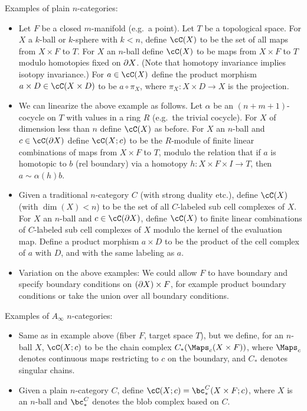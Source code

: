 Examples of plain $n$-categories:
\begin{itemize}

\item Let $F$ be a closed $m$-manifold (e.g.\ a point).
Let $T$ be a topological space.
For $X$ a $k$-ball or $k$-sphere with $k < n$, define $\cC(X)$ to be the set of 
all maps from $X\times F$ to $T$.
For $X$ an $n$-ball define $\cC(X)$ to be maps from $X\times F$ to $T$ modulo
homotopies fixed on $\partial X$.
(Note that homotopy invariance implies isotopy invariance.)
For $a\in \cC(X)$ define the product morphism $a\times D \in \cC(X\times D)$ to
be $a\circ\pi_X$, where $\pi_X : X\times D \to X$ is the projection.

\item We can linearize the above example as follows.
Let $\alpha$ be an $(n{+}m{+}1)$-cocycle on $T$ with values in a ring $R$
(e.g.\ the trivial cocycle).
For $X$ of dimension less than $n$ define $\cC(X)$ as before.
For $X$ an $n$-ball and $c\in \cC(\bd X)$ define $\cC(X; c)$ to be
the $R$-module of finite linear combinations of maps from $X\times F$ to $T$,
modulo the relation that if $a$ is homotopic to $b$ (rel boundary) via a homotopy
$h: X\times F\times I \to T$, then $a \sim \alpha(h)b$.

\item Given a traditional $n$-category $C$ (with strong duality etc.),
define $\cC(X)$ (with $\dim(X) < n$) 
to be the set of all $C$-labeled sub cell complexes of $X$.
For $X$ an $n$-ball and $c\in \cC(\bd X)$, define $\cC(X)$ to finite linear
combinations of $C$-labeled sub cell complexes of $X$
modulo the kernel of the evaluation map.
Define a product morphism $a\times D$ to be the product of the cell complex of $a$ with $D$,
and with the same labeling as $a$.

\item Variation on the above examples:
We could allow $F$ to have boundary and specify boundary conditions on $(\partial X)\times F$,
for example product boundary conditions or take the union over all boundary conditions.

\end{itemize}


Examples of $A_\infty$ $n$-categories:
\begin{itemize}

\item Same as in example  above (fiber $F$, target space $T$),
but we define, for an $n$-ball $X$, $\cC(X; c)$ to be the chain complex 
$C_*(\Maps_c(X\times F))$, where $\Maps_c$ denotes continuous maps restricting to $c$ on the boundary,
and $C_*$ denotes singular chains.

\item
Given a plain $n$-category $C$, 
define $\cC(X; c) = \bc^C_*(X\times F; c)$, where $X$ is an $n$-ball
and $\bc^C_*$ denotes the blob complex based on $C$.

\end{itemize}

